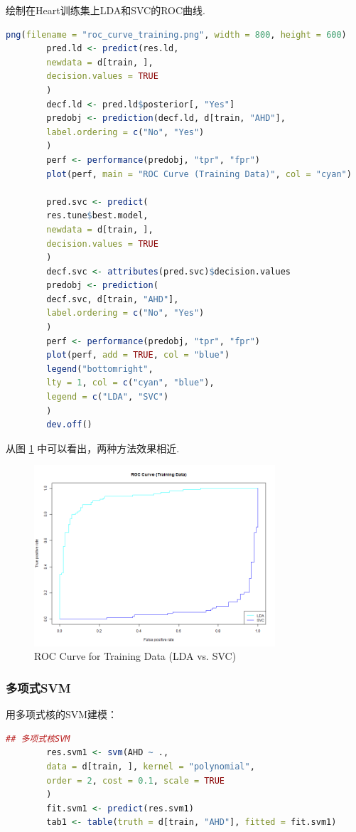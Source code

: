 \documentclass[12pt, a4paper, oneside]{ctexart}
\begin{document}
	绘制在Heart训练集上LDA和SVC的ROC曲线.
	\begin{lstlisting}[language=R]
		png(filename = "roc_curve_training.png", width = 800, height = 600)
		pred.ld <- predict(res.ld,
		newdata = d[train, ],
		decision.values = TRUE
		)
		decf.ld <- pred.ld$posterior[, "Yes"]
		predobj <- prediction(decf.ld, d[train, "AHD"],
		label.ordering = c("No", "Yes")
		)
		perf <- performance(predobj, "tpr", "fpr")
		plot(perf, main = "ROC Curve (Training Data)", col = "cyan")
		
		pred.svc <- predict(
		res.tune$best.model,
		newdata = d[train, ],
		decision.values = TRUE
		)
		decf.svc <- attributes(pred.svc)$decision.values
		predobj <- prediction(
		decf.svc, d[train, "AHD"],
		label.ordering = c("No", "Yes")
		)
		perf <- performance(predobj, "tpr", "fpr")
		plot(perf, add = TRUE, col = "blue")
		legend("bottomright",
		lty = 1, col = c("cyan", "blue"),
		legend = c("LDA", "SVC")
		)
		dev.off()
	\end{lstlisting}
	从图 \ref{fig:roc_curve} 中可以看出，两种方法效果相近.
	\begin{figure}[htbp]
		\centering
		\includegraphics[width=0.8\textwidth]{../Figure/roc_curve_training.png}
		\caption{ROC Curve for Training Data (LDA vs. SVC)}
		\label{fig:roc_curve}
	\end{figure}
	\subsubsection{多项式SVM}
	
	用多项式核的SVM建模：
	\begin{lstlisting}[language=R]
		## 多项式核SVM
		res.svm1 <- svm(AHD ~ .,
		data = d[train, ], kernel = "polynomial",
		order = 2, cost = 0.1, scale = TRUE
		)
		fit.svm1 <- predict(res.svm1)
		tab1 <- table(truth = d[train, "AHD"], fitted = fit.svm1)
	\end{lstlisting}
	
\end{document}
